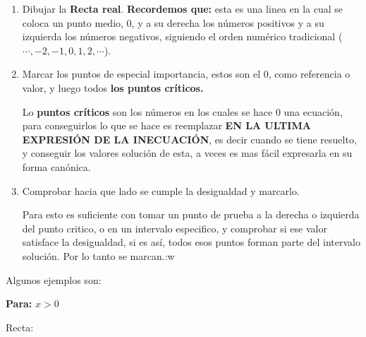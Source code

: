     \begin{enumerate}
        \item Dibujar la \textbf{Recta real}. \textbf{Recordemos que:} esta es una
            linea en la cual se coloca un punto medio, 0, y a su derecha los números
            positivos y a su izquierda los números negativos, siguiendo el orden
            numérico tradicional ($\cdots,-2,-1,0,1,2,\cdots$).

        \item Marcar los puntos de especial importancia, estos son el 0, como
            referencia o valor, y luego todos \textbf{los puntos críticos.}

            Lo \textbf{puntos críticos} son los números en los cuales se hace 0
            una ecuación, para conseguirlos lo que se hace es reemplazar \textbf{
            EN LA ULTIMA EXPRESIÓN DE LA INECUACIÓN}, es decir cuando se tiene
            resuelto, y  conseguir los valores solución de esta, a veces es mas
            fácil expresarla en su forma canónica.

        \item Comprobar hacia que lado se cumple la desigualdad y marcarlo.

            Para esto es suficiente con tomar un punto de prueba a la derecha o
            izquierda del punto critico, o en un intervalo especifico, y comprobar
            si ese valor satisface la desigualdad, si es así, todos esos puntos
            forman parte del intervalo solución. Por lo tanto se marcan.:w

    \end{enumerate}

    Algunos ejemplos son:

    \textbf{Para: } $x>0$

    Recta:

    \vspace*{1cm}


